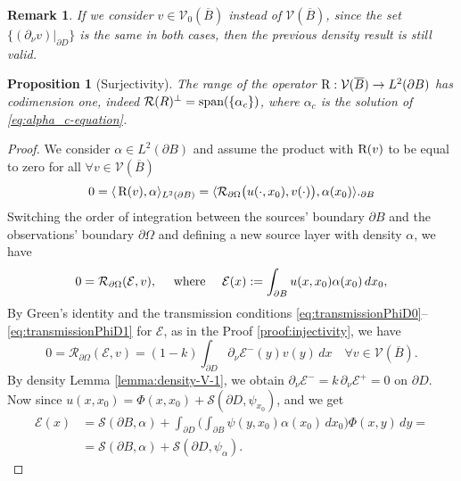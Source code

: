 \documentclass[10pt, a4paper, twoside, openright]{book}
\theoremstyle{definition}
\theoremstyle{plain}
\theoremstyle{plain}
\theoremstyle{plain}
\newtheorem{proposition}[subsection]{Proposition}
\theoremstyle{plain}
\newtheorem{remark}[subsection]{Remark}
\theoremstyle{plain}
\theoremstyle{plain}
\theoremstyle{plain}
\theoremstyle{plain}
\begin{document}
\begin{remark}
 If we consider $v\in\mathcal{V}_0(\overline{B})$ instead of $\mathcal{V}(\overline{B})$, since the set $\{(\partial_\nu v )|_{\partial D}\}$ is the same in both cases, then the previous density result is still valid.
\end{remark}
\begin{proposition}[Surjectivity]
\label{prop:surjectivity}
 The range of the operator $\textup{R} : \mathcal{V}(\overline{B})\to L^2(\partial B)$  has codimension one, indeed $\mathcal{R}(R)^\perp=\textup{span}(\{\alpha_c\})$, where $\alpha_c$ is the solution of \eqref{eq:alpha_c-equation}.
\end{proposition}
\begin{proof}
\label{proof:surjectivity}
 We consider $\alpha\in L^2(\partial B)$ and assume the product with $\textup{R}(v)$ to be equal to zero for all $\forall v\in\mathcal{V}(\overline{B})$
 \begin{equation*}
  0 =\langle\,\textup{R}(v), \alpha\rangle_{L^2(\partial B)} = \langle \mathcal{R}_{\partial\Omega}\bigl(u(\cdot,x_0),v(\cdot)\bigr), \alpha(x_0)\rangle._{\partial B}
 \end{equation*}
 Switching the order of integration between the sources' boundary $\partial B$ and
 the observations' boundary $\partial \Omega$ and defining a new source layer with density $\alpha$, 
 we have
 \begin{equation}
  0 = \mathcal{R}_{\partial \Omega}(\mathcal{E},v),\quad\textup{ where }\quad\mathcal{E}(x):=\int_{\partial B}u(x,x_0)\alpha(x_0)\, dx_0,
 \end{equation}
 By Green's identity and the transmission conditions \eqref{eq:transmissionPhiD0}--\eqref{eq:transmissionPhiD1} for $\mathcal{E}$, as in the Proof \ref{proof:injectivity}, we have
 \begin{equation}
  0 = \mathcal{R}_{\partial \Omega}(\mathcal{E},v)=(1-k)\int_{\partial D} \partial_\nu\mathcal{E}^-(y)v(y)\,dx\quad \forall v \in \mathcal{V}(\overline{B}).
 \end{equation}
 By density Lemma \ref{lemma:density-V-1}, we obtain $\partial_\nu\mathcal{E}^- = k\,\partial_\nu\mathcal{E}^+= 0$ on $\partial D$. 
 Now since $u(x,x_0)=\Phi(x,x_0)+\mathcal{S}(\partial D, \psi_{x_0})$, and we get
 \begin{align}
  \mathcal{E}(x)&=\mathcal{S}(\partial B, \alpha) + \int_{\partial D} \Big(\int_{\partial B}\psi(y,x_0)\alpha(x_0)\,dx_0\Big)\Phi(x,y)\,dy = \\
  &=\mathcal{S}(\partial B, \alpha) + \mathcal{S}(\partial D, \psi_\alpha).

\end{align}
\end{proof}
\end{document}
